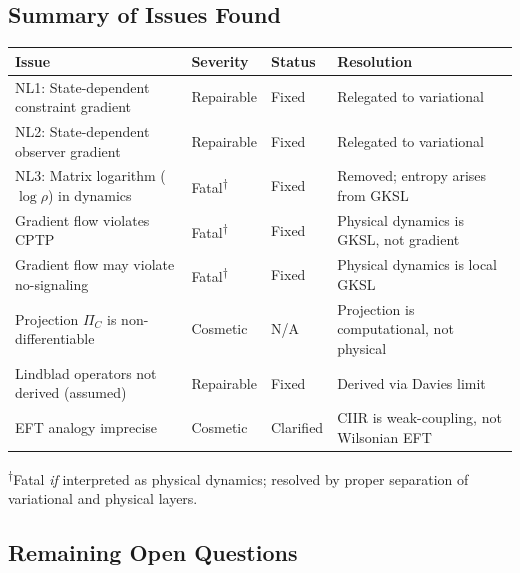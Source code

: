 \subsection{Summary of Issues Found}

\begin{center}
\begin{tabular}{@{}llll@{}}
\toprule
\textbf{Issue} & \textbf{Severity} & \textbf{Status} & \textbf{Resolution} \\
\midrule
NL1: State-dependent constraint gradient & Repairable & Fixed &
  Relegated to variational \\
NL2: State-dependent observer gradient & Repairable & Fixed &
  Relegated to variational \\
NL3: Matrix logarithm ($\log\rho$) in dynamics & Fatal\textsuperscript{$\dagger$} & Fixed &
  Removed; entropy arises from GKSL \\
Gradient flow violates CPTP & Fatal\textsuperscript{$\dagger$} & Fixed &
  Physical dynamics is GKSL, not gradient \\
Gradient flow may violate no-signaling & Fatal\textsuperscript{$\dagger$} & Fixed &
  Physical dynamics is local GKSL \\
Projection $\Pi_C$ is non-differentiable & Cosmetic & N/A &
  Projection is computational, not physical \\
Lindblad operators not derived (assumed) & Repairable & Fixed &
  Derived via Davies limit \\
EFT analogy imprecise & Cosmetic & Clarified &
  CIIR is weak-coupling, not Wilsonian EFT \\
\bottomrule
\end{tabular}
\end{center}

\textsuperscript{$\dagger$}Fatal \emph{if} interpreted as physical dynamics;
resolved by proper separation of variational and physical layers.

\subsection{Remaining Open Questions}

